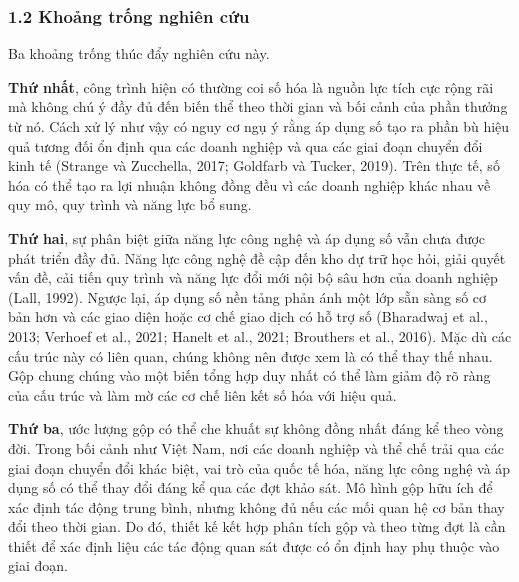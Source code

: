 \documentclass[12pt,a4paper]{article}
\begin{document}
\hypertarget{12-khoux1ea3ng-trux1ed1ng-nghiuxean-cux1ee9u}{%
\subsubsection{1.2 Khoảng trống nghiên
cứu}\label{12-khoux1ea3ng-trux1ed1ng-nghiuxean-cux1ee9u}}

Ba khoảng trống thúc đẩy nghiên cứu này.

\textbf{Thứ nhất}, công trình hiện có thường coi số hóa là nguồn lực
tích cực rộng rãi mà không chú ý đầy đủ đến biến thể theo thời gian và
bối cảnh của phần thưởng từ nó. Cách xử lý như vậy có nguy cơ ngụ ý rằng
áp dụng số tạo ra phần bù hiệu quả tương đối ổn định qua các doanh
nghiệp và qua các giai đoạn chuyển đổi kinh tế (Strange và Zucchella,
2017; Goldfarb và Tucker, 2019). Trên thực tế, số hóa có thể tạo ra lợi
nhuận không đồng đều vì các doanh nghiệp khác nhau về quy mô, quy trình
và năng lực bổ sung.

\textbf{Thứ hai}, sự phân biệt giữa năng lực công nghệ và áp dụng số vẫn
chưa được phát triển đầy đủ. Năng lực công nghệ đề cập đến kho dự trữ
học hỏi, giải quyết vấn đề, cải tiến quy trình và năng lực đổi mới nội
bộ sâu hơn của doanh nghiệp (Lall, 1992). Ngược lại, áp dụng số nền tảng
phản ánh một lớp sẵn sàng số cơ bản hơn và các giao diện hoặc cơ chế
giao dịch có hỗ trợ số (Bharadwaj et al., 2013; Verhoef et al., 2021;
Hanelt et al., 2021; Brouthers et al., 2016). Mặc dù các cấu trúc này có
liên quan, chúng không nên được xem là có thể thay thế nhau. Gộp chung
chúng vào một biến tổng hợp duy nhất có thể làm giảm độ rõ ràng của cấu
trúc và làm mờ các cơ chế liên kết số hóa với hiệu quả.

\textbf{Thứ ba}, ước lượng gộp có thể che khuất sự không đồng nhất đáng
kể theo vòng đời. Trong bối cảnh như Việt Nam, nơi các doanh nghiệp và
thể chế trải qua các giai đoạn chuyển đổi khác biệt, vai trò của quốc tế
hóa, năng lực công nghệ và áp dụng số có thể thay đổi đáng kể qua các
đợt khảo sát. Mô hình gộp hữu ích để xác định tác động trung bình, nhưng
không đủ nếu các mối quan hệ cơ bản thay đổi theo thời gian. Do đó,
thiết kế kết hợp phân tích gộp và theo từng đợt là cần thiết để xác định
liệu các tác động quan sát được có ổn định hay phụ thuộc vào giai đoạn.
\end{document}
